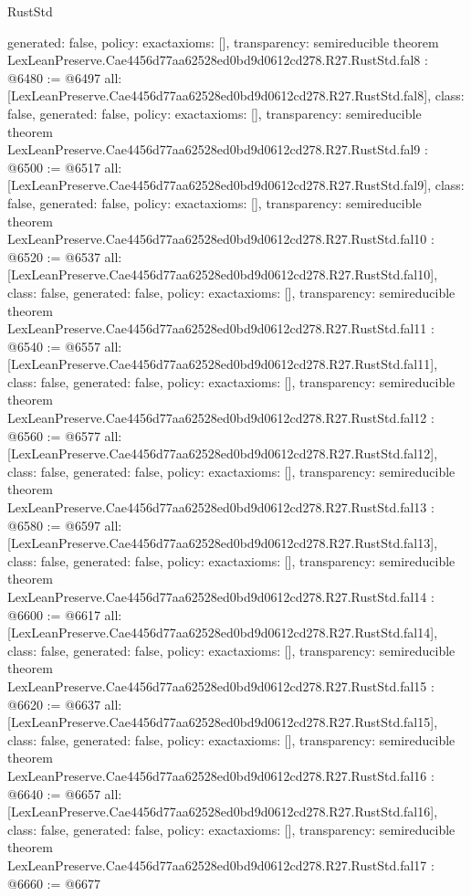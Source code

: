 \begin{lexlean}{RustStd}
\begin{coremodule}
{  generated: false,
  policy: exact{axioms: []},
  transparency: semireducible
}
theorem LexLeanPreserve.Cae4456d77aa62528ed0bd9d0612cd278.R27.RustStd.fal8 : @6480 := @6497 {
  all: [LexLeanPreserve.Cae4456d77aa62528ed0bd9d0612cd278.R27.RustStd.fal8],
  class: false,
  generated: false,
  policy: exact{axioms: []},
  transparency: semireducible
}
theorem LexLeanPreserve.Cae4456d77aa62528ed0bd9d0612cd278.R27.RustStd.fal9 : @6500 := @6517 {
  all: [LexLeanPreserve.Cae4456d77aa62528ed0bd9d0612cd278.R27.RustStd.fal9],
  class: false,
  generated: false,
  policy: exact{axioms: []},
  transparency: semireducible
}
theorem LexLeanPreserve.Cae4456d77aa62528ed0bd9d0612cd278.R27.RustStd.fal10 : @6520 := @6537 {
  all: [LexLeanPreserve.Cae4456d77aa62528ed0bd9d0612cd278.R27.RustStd.fal10],
  class: false,
  generated: false,
  policy: exact{axioms: []},
  transparency: semireducible
}
theorem LexLeanPreserve.Cae4456d77aa62528ed0bd9d0612cd278.R27.RustStd.fal11 : @6540 := @6557 {
  all: [LexLeanPreserve.Cae4456d77aa62528ed0bd9d0612cd278.R27.RustStd.fal11],
  class: false,
  generated: false,
  policy: exact{axioms: []},
  transparency: semireducible
}
theorem LexLeanPreserve.Cae4456d77aa62528ed0bd9d0612cd278.R27.RustStd.fal12 : @6560 := @6577 {
  all: [LexLeanPreserve.Cae4456d77aa62528ed0bd9d0612cd278.R27.RustStd.fal12],
  class: false,
  generated: false,
  policy: exact{axioms: []},
  transparency: semireducible
}
theorem LexLeanPreserve.Cae4456d77aa62528ed0bd9d0612cd278.R27.RustStd.fal13 : @6580 := @6597 {
  all: [LexLeanPreserve.Cae4456d77aa62528ed0bd9d0612cd278.R27.RustStd.fal13],
  class: false,
  generated: false,
  policy: exact{axioms: []},
  transparency: semireducible
}
theorem LexLeanPreserve.Cae4456d77aa62528ed0bd9d0612cd278.R27.RustStd.fal14 : @6600 := @6617 {
  all: [LexLeanPreserve.Cae4456d77aa62528ed0bd9d0612cd278.R27.RustStd.fal14],
  class: false,
  generated: false,
  policy: exact{axioms: []},
  transparency: semireducible
}
theorem LexLeanPreserve.Cae4456d77aa62528ed0bd9d0612cd278.R27.RustStd.fal15 : @6620 := @6637 {
  all: [LexLeanPreserve.Cae4456d77aa62528ed0bd9d0612cd278.R27.RustStd.fal15],
  class: false,
  generated: false,
  policy: exact{axioms: []},
  transparency: semireducible
}
theorem LexLeanPreserve.Cae4456d77aa62528ed0bd9d0612cd278.R27.RustStd.fal16 : @6640 := @6657 {
  all: [LexLeanPreserve.Cae4456d77aa62528ed0bd9d0612cd278.R27.RustStd.fal16],
  class: false,
  generated: false,
  policy: exact{axioms: []},
  transparency: semireducible
}
theorem LexLeanPreserve.Cae4456d77aa62528ed0bd9d0612cd278.R27.RustStd.fal17 : @6660 := @6677 {
}
\end{coremodule}
\end{lexlean}
